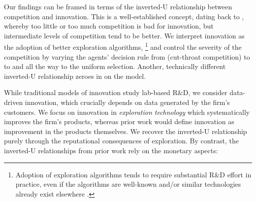 Our findings can be framed in terms of the inverted-U relationship between competition and innovation. This is a well-established concept, dating back to \cite{Schumpeter-42}, whereby too little or too much competition is bad for innovation, but intermediate levels of competition tend to be better. %
We interpret innovation as the adoption of better exploration algorithms,%
\footnote{Adoption of exploration algorithms tends to require substantial R\&D effort in practice, even if the algorithms are well-known and/or similar technologies already exist elsewhere \citep[\eg see][]{DS-arxiv}.}
and control the severity of the competition by varying the agents' decision rule from \HardMax (cut-throat competition) to \HardMaxRandom to \SoftMaxRandom and all the way to the uniform selection.
Another, technically different inverted-U relationship zeroes in on the \HardMaxRandom model.

While traditional models of innovation study lab-based R\&D, we consider data-driven innovation, which crucially depends on data generated by the firm's customers.
We focus on innovation in \emph{exploration technology} which systematically improves the firm's products, whereas prior work would define innovation as improvement in the products themselves. We recover the  inverted-U relationship purely through the reputational consequences of exploration.
By contrast, the inverted-U relationships from prior work rely on the monetary aspects: 








